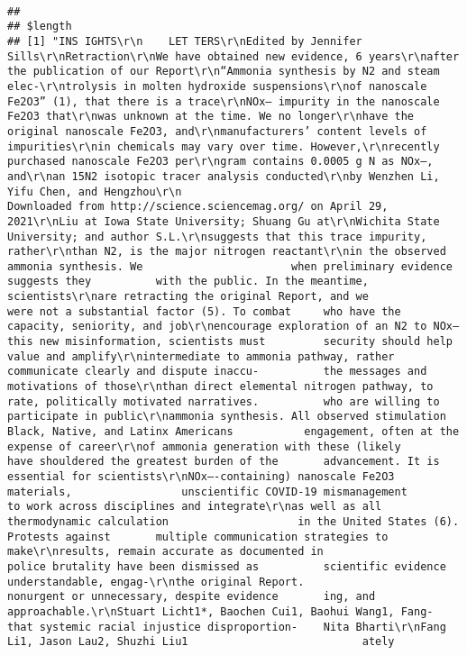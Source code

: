 \documentclass[
]{book}
\begin{document}
\begin{verbatim}
                                                                                                                                                                                                                                                                                             
## 
## $length
## [1] "INS IGHTS\r\n    LET TERS\r\nEdited by Jennifer Sills\r\nRetraction\r\nWe have obtained new evidence, 6 years\r\nafter the publication of our Report\r\n“Ammonia synthesis by N2 and steam elec-\r\ntrolysis in molten hydroxide suspensions\r\nof nanoscale Fe2O3” (1), that there is a trace\r\nNOx– impurity in the nanoscale Fe2O3 that\r\nwas unknown at the time. We no longer\r\nhave the original nanoscale Fe2O3, and\r\nmanufacturers’ content levels of impurities\r\nin chemicals may vary over time. However,\r\nrecently purchased nanoscale Fe2O3 per\r\ngram contains 0.0005 g N as NOx–, and\r\nan 15N2 isotopic tracer analysis conducted\r\nby Wenzhen Li, Yifu Chen, and Hengzhou\r\n                                                                                                                                                                                                                       Downloaded from http://science.sciencemag.org/ on April 29, 2021\r\nLiu at Iowa State University; Shuang Gu at\r\nWichita State University; and author S.L.\r\nsuggests that this trace impurity, rather\r\nthan N2, is the major nitrogen reactant\r\nin the observed ammonia synthesis. We                       when preliminary evidence suggests they          with the public. In the meantime, scientists\r\nare retracting the original Report, and we                  were not a substantial factor (5). To combat     who have the capacity, seniority, and job\r\nencourage exploration of an N2 to NOx–                      this new misinformation, scientists must         security should help value and amplify\r\nintermediate to ammonia pathway, rather                     communicate clearly and dispute inaccu-          the messages and motivations of those\r\nthan direct elemental nitrogen pathway, to                  rate, politically motivated narratives.          who are willing to participate in public\r\nammonia synthesis. All observed stimulation                    Black, Native, and Latinx Americans           engagement, often at the expense of career\r\nof ammonia generation with these (likely                    have shouldered the greatest burden of the       advancement. It is essential for scientists\r\nNOx–-containing) nanoscale Fe2O3 materials,                 unscientific COVID-19 mismanagement              to work across disciplines and integrate\r\nas well as all thermodynamic calculation                    in the United States (6). Protests against       multiple communication strategies to make\r\nresults, remain accurate as documented in                   police brutality have been dismissed as          scientific evidence understandable, engag-\r\nthe original Report.                                        nonurgent or unnecessary, despite evidence       ing, and approachable.\r\nStuart Licht1*, Baochen Cui1, Baohui Wang1, Fang-           that systemic racial injustice disproportion-    Nita Bharti\r\nFang Li1, Jason Lau2, Shuzhi Liu1                           ately 
\end{verbatim}
\end{document}
